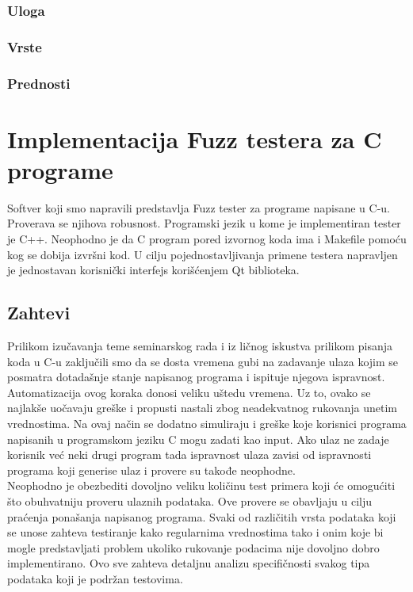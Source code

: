 \documentclass[a4paper]{article}
\begin{document}
{\subsubsection{Uloga}
\label{subsubsec:uloga_fuzz_testiranja} 

\subsubsection{Vrste}
\label{subsubsec:vrste_fuzz_testiranja}

\subsubsection{Prednosti}
\label{subsubsec:prednosti_fuzz_testiranja}

\section{Implementacija Fuzz testera za C programe}
\label{sec:implementacija_fuzz_testera}

Softver koji smo napravili predstavlja Fuzz tester za programe napisane u C-u. Proverava se njihova robusnost. Programski jezik u kome je implementiran tester je C++. Neophodno je da C program pored izvornog koda ima i Makefile pomoću kog se dobija izvršni kod. U cilju pojednostavljivanja primene testera napravljen je jednostavan korisnički interfejs korišćenjem Qt biblioteka. 

\subsection{Zahtevi}
\label{subsec:zahtevi_testera}

Prilikom izučavanja teme seminarskog rada i iz ličnog iskustva prilikom pisanja koda u C-u zaključili smo da se dosta vremena gubi na zadavanje ulaza kojim se posmatra dotadašnje stanje napisanog programa i ispituje njegova ispravnost. Automatizacija ovog koraka donosi veliku uštedu vremena. Uz to, ovako se najlakše uočavaju greške i propusti nastali zbog neadekvatnog rukovanja unetim vrednostima. Na ovaj način se dodatno simuliraju i greške koje korisnici programa napisanih u programskom jeziku C mogu zadati kao input. Ako ulaz ne zadaje korisnik već neki drugi program tada ispravnost ulaza zavisi od ispravnosti programa koji generise ulaz i provere su takođe neophodne.\\

Neophodno je obezbediti dovoljno veliku količinu test primera koji će omogućiti što obuhvatniju proveru ulaznih podataka. Ove provere se obavljaju u cilju praćenja ponašanja napisanog programa. Svaki od različitih vrsta podataka koji se unose zahteva testiranje kako regularnima vrednostima tako i onim koje bi mogle predstavljati problem ukoliko rukovanje podacima nije dovoljno dobro implementirano. Ovo sve zahteva detaljnu analizu specifičnosti svakog tipa podataka koji je podržan testovima.

}
\end{document}
